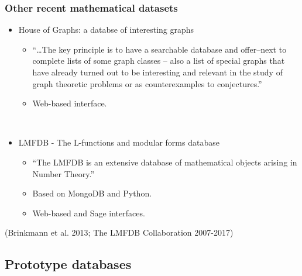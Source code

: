 \documentclass[pdf,sprung,slideColor,nocolorBG]{beamer}
\newenvironment{colortheme}[1]{
\def\ProvidesPackageRCS $##1${\relax}
\renewcommand{\ProcessOptions}{\relax}
\makeatletter

\makeatother
}{}
\newcommand{\slidecite}[1]{\tiny{(#1)}\normalsize{}}
\begin{document}
\begin{colortheme}{jubata}
\begin{frame}
\frametitle{Other recent mathematical datasets}
\begin{itemize}
 \item
House of Graphs: a databse of interesting graphs
 \begin{itemize}
  \item
``\ldots The key principle is to have a searchable database and offer–next to complete lists of some graph classes -- also a list of special graphs that have already turned out to be interesting and relevant in the study of graph theoretic problems or as counterexamples to conjectures.''
  \item
Web-based interface.
 \end{itemize}

~

 \item
LMFDB - The L-functions and modular forms database
 \begin{itemize}
  \item
``The LMFDB is an extensive database of mathematical objects arising in Number Theory.''
  \item
Based on MongoDB and Python.
  \item
Web-based and Sage interfaces.
 \end{itemize}
\end{itemize}
\slidecite{Brinkmann et al. 2013; The LMFDB Collaboration 2007-2017}
\end{frame}

\end{colortheme}

\subsection{Prototype databases}
\end{document}
